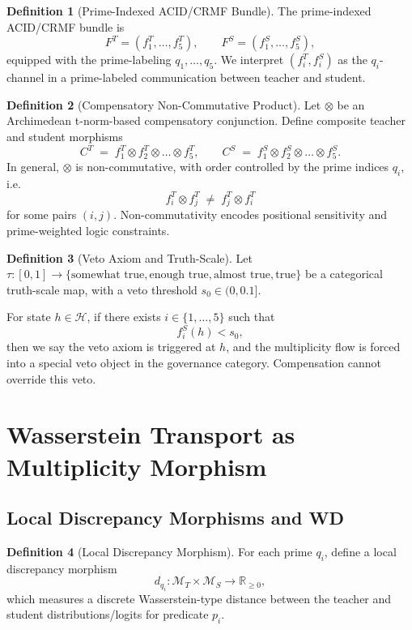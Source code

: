 \documentclass[11pt]{article}
\theoremstyle{definition}
\newtheorem{defn}{Definition}[section]
\theoremstyle{plain}
\theoremstyle{remark}
\begin{document}
\begin{defn}[Prime-Indexed ACID/CRMF Bundle]
The prime-indexed ACID/CRMF bundle is
\[
  F^T = (f_1^T,\dots,f_5^T),
  \qquad
  F^S = (f_1^S,\dots,f_5^S),
\]
equipped with the prime-labeling \(q_1,\dots,q_5\). We interpret \((f_i^T, f_i^S)\) as the \(q_i\)-channel in a prime-labeled communication between teacher and student.
\end{defn}

\begin{defn}[Compensatory Non-Commutative Product]
Let \(\otimes\) be an Archimedean t-norm-based compensatory conjunction. Define composite teacher and student morphisms
\[
  C^T \;=\; f_1^T \otimes f_2^T \otimes \dots \otimes f_5^T,
  \qquad
  C^S \;=\; f_1^S \otimes f_2^S \otimes \dots \otimes f_5^S.
\]
In general, \(\otimes\) is non-commutative, with order controlled by the prime indices \(q_i\), i.e.
\[
  f_i^T \otimes f_j^T \;\neq\; f_j^T \otimes f_i^T
\]
for some pairs \((i,j)\). Non-commutativity encodes positional sensitivity and prime-weighted logic constraints.
\end{defn}

\begin{defn}[Veto Axiom and Truth-Scale]
Let \(\tau : [0,1] \to \{\text{somewhat true}, \text{enough true}, \text{almost true}, \text{true}\}\) be a categorical truth-scale map, with a veto threshold \(s_0 \in (0,0.1]\).

For state \(h\in\mathcal{H}\), if there exists \(i\in\{1,\dots,5\}\) such that
\[
  f_i^S(h) < s_0,
\]
then we say the veto axiom is triggered at \(h\), and the multiplicity flow is forced into a special veto object in the governance category. Compensation cannot override this veto.
\end{defn}

\section{Wasserstein Transport as Multiplicity Morphism}

\subsection{Local Discrepancy Morphisms and WD}

\begin{defn}[Local Discrepancy Morphism]
For each prime \(q_i\), define a local discrepancy morphism
\[
  d_{q_i} : \mathcal{M}_T \times \mathcal{M}_S \to \mathbb{R}_{\ge 0},
\]
which measures a discrete Wasserstein-type distance between the teacher and student distributions/logits for predicate \(p_i\).
\end{defn}
\end{document}
